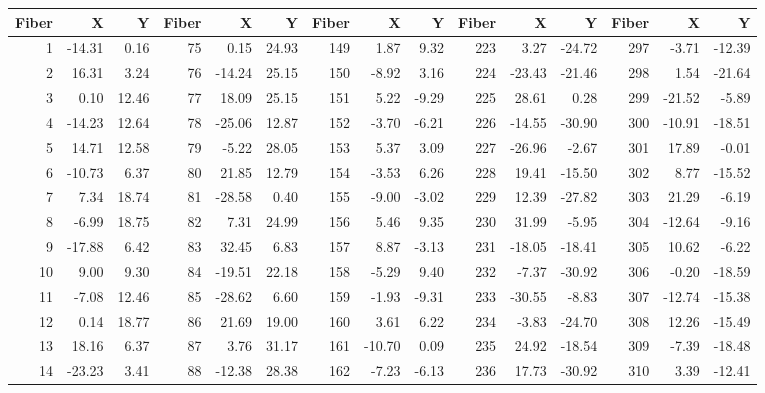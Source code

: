 \begin{table}[!h]
\setlength{\tabcolsep}{4pt}
\renewcommand{\arraystretch}{0.94}
\centering
{\tiny
\begin{tabular}{|r r r||r r r||r r r||r r r||r r r|}
\hline
Fiber  &  X  &  Y  & Fiber  &  X  &  Y  & Fiber  &  X  &  Y  & Fiber  &  X  &  Y  & Fiber  &  X  &  Y  \\
\hline
 1 & -14.31 &  0.16 &  75 &   0.15 & 24.93 & 149 &   1.87 &   9.32 & 223 &   3.27 & -24.72 & 297 &  -3.71 & -12.39 \\
 2 &  16.31 &  3.24 &  76 & -14.24 & 25.15 & 150 &  -8.92 &   3.16 & 224 & -23.43 & -21.46 & 298 &   1.54 & -21.64 \\
 3 &   0.10 & 12.46 &  77 &  18.09 & 25.15 & 151 &   5.22 &  -9.29 & 225 &  28.61 &   0.28 & 299 & -21.52 &  -5.89 \\
 4 & -14.23 & 12.64 &  78 & -25.06 & 12.87 & 152 &  -3.70 &  -6.21 & 226 & -14.55 & -30.90 & 300 & -10.91 & -18.51 \\
 5 &  14.71 & 12.58 &  79 &  -5.22 & 28.05 & 153 &   5.37 &   3.09 & 227 & -26.96 &  -2.67 & 301 &  17.89 &  -0.01 \\
 6 & -10.73 &  6.37 &  80 &  21.85 & 12.79 & 154 &  -3.53 &   6.26 & 228 &  19.41 & -15.50 & 302 &   8.77 & -15.52 \\
 7 &   7.34 & 18.74 &  81 & -28.58 &  0.40 & 155 &  -9.00 &  -3.02 & 229 &  12.39 & -27.82 & 303 &  21.29 &  -6.19 \\
 8 &  -6.99 & 18.75 &  82 &   7.31 & 24.99 & 156 &   5.46 &   9.35 & 230 &  31.99 &  -5.95 & 304 & -12.64 &  -9.16 \\
 9 & -17.88 &  6.42 &  83 &  32.45 &  6.83 & 157 &   8.87 &  -3.13 & 231 & -18.05 & -18.41 & 305 &  10.62 &  -6.22 \\
10 &   9.00 &  9.30 &  84 & -19.51 & 22.18 & 158 &  -5.29 &   9.40 & 232 &  -7.37 & -30.92 & 306 &  -0.20 & -18.59 \\
11 &  -7.08 & 12.46 &  85 & -28.62 &  6.60 & 159 &  -1.93 &  -9.31 & 233 & -30.55 &  -8.83 & 307 & -12.74 & -15.38 \\
12 &   0.14 & 18.77 &  86 &  21.69 & 19.00 & 160 &   3.61 &   6.22 & 234 &  -3.83 & -24.70 & 308 &  12.26 & -15.49 \\
13 &  18.16 &  6.37 &  87 &   3.76 & 31.17 & 161 & -10.70 &   0.09 & 235 &  24.92 & -18.54 & 309 &  -7.39 & -18.48 \\
14 & -23.23 &  3.41 &  88 & -12.38 & 28.38 & 162 &  -7.23 &  -6.13 & 236 &  17.73 & -30.92 & 310 &   3.39 & -12.41 \\

\end{tabular}}
\end{table}
